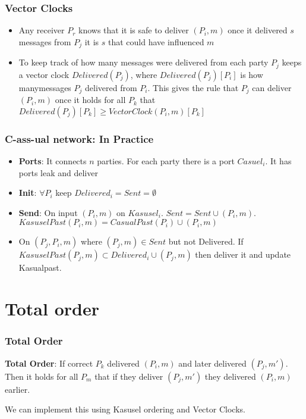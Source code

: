     \begin{frame}
        \frametitle{Vector Clocks}
            \begin{itemize}
                \item Any receiver $P_r$ knows that it is safe to deliver $(P_i, m)$ once it delivered $s$ messages from $P_j$ it is $s$ that could have influenced $m$
                \item To keep track of how many messages were delivered from each party $P_j$ keeps a vector clock $Delivered(P_j)$, where $Delivered(P_j)[P_i]$ is how manymessages $P_j$ delivered from $P_i$. This gives the rule that $P_j$ can deliver $(P_i, m)$ once it holds for all $P_k$ that $Delivered(P_j)[P_k] \geq VectorClock(P_i, m)[P_k]$
            \end{itemize}
    \end{frame}


    \begin{frame}
        \frametitle{C-ass-ual network: In Practice}
            \begin{itemize}
                \item \textbf{Ports}: It connects $n$ parties. For each party there is a port $Casuel_i$. It has ports leak and deliver
                \item \textbf{Init}: $\forall P_i$ keep $Delivered_i = Sent = \emptyset$
                \item \textbf{Send}: On input $(P_i, m)$ on $Kasusel_i$. $Sent = Sent \cup (P_i, m)$. $KasuselPast(P_i, m) = CasualPast(P_i) \cup (P_i, m)$
                \item On $(P_j, P_i, m)$ where $(P_j, m) \in Sent$ but not Delivered. If $KasuselPast(P_j, m) \subset Delivered_i \cup (P_j, m)$ then deliver it and update Kasualpast. 
            \end{itemize}
    \end{frame}

\section{Total order}
    \begin{frame}
        \frametitle{Total Order}
            \textbf{Total Order}: If correct $P_k$ delivered $(P_i, m)$ and later delivered $(P_j, m')$. Then it holds for all $P_m$ that if they deliver $(P_j, m')$ they delivered $(P_i, m)$ earlier. 
        
            We can implement this using Kasusel ordering and Vector Clocks. 
    \end{frame}

